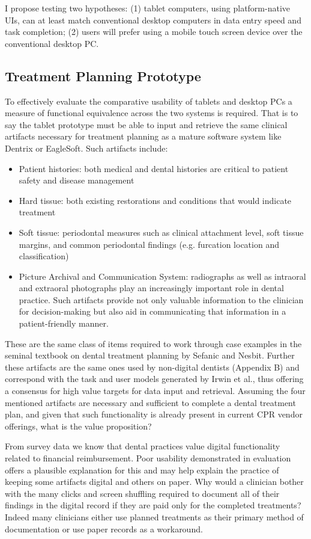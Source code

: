 \documentclass[11pt]{article}
\begin{document}
I propose testing two hypotheses: (1) tablet computers, using platform-native UIs, can at least match conventional desktop computers in data entry speed and task completion; (2) users will prefer using a mobile touch screen device over the conventional desktop PC.

\subsection{Treatment Planning Prototype}

To effectively evaluate the comparative usability of tablets and desktop PCs a measure of functional equivalence across the two systems is required. That is to say the tablet prototype must be able to input and retrieve the same clinical artifacts necessary for treatment planning as a mature software system like Dentrix or EagleSoft. Such artifacts include:
\begin{itemize}
\item Patient histories: both medical and dental histories are critical to patient safety and disease management
\item Hard tissue: both existing restorations and conditions that would indicate treatment
\item Soft tissue: periodontal measures such as clinical attachment level, soft tissue margins, and common periodontal findings (e.g. furcation location and classification)
\item Picture Archival and Communication System: radiographs as well as intraoral and extraoral photographs play an increasingly important role in dental practice. Such artifacts provide not only valuable information to the clinician for decision-making but also aid in communicating that information in a patient-friendly manner.
\end{itemize}
These are the same class of items required to work through case examples in the seminal textbook on dental treatment planning by Sefanic and Nesbit\cite{Stefanac2006Treatment-Plann}. Further these artifacts are the same ones used by non-digital dentists (Appendix B) and correspond with the task and user models generated by Irwin et al., thus offering a consensus for high value targets for data input and retrieval. Assuming the four mentioned artifacts are necessary and sufficient to complete a dental treatment plan, and given that such functionality is already present in current CPR vendor offerings, what is the value proposition?

From survey data we know that dental practices value digital functionality related to financial reimbursement. Poor usability demonstrated in evaluation offers a plausible explanation for this and may help explain the practice of keeping some artifacts digital and others on paper. Why would a clinician bother with the many clicks and screen shuffling required to document all of their findings in the digital record if they are paid only for the completed treatments? Indeed many clinicians either use planned treatments as their primary method of documentation or use paper records as a workaround. 
\end{document}
